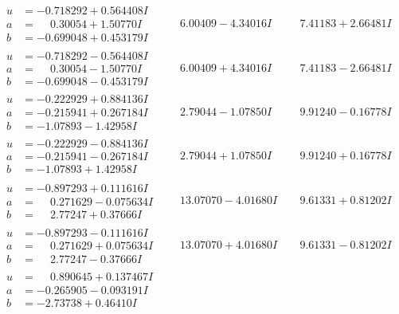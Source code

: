 \documentclass[1p]{elsarticle_modified}
\theoremstyle{definition}
\begin{document}
$$\begin{array}{c|c|c}
\begin{aligned}
u &= -0.718292 + 0.564408 I \\
a &= \phantom{-}0.30054 + 1.50770 I \\
b &= -0.699048 + 0.453179 I\end{aligned}
 & \phantom{-}6.00409 - 4.34016 I & \phantom{-}7.41183 + 2.66481 I \\ \hline\begin{aligned}
u &= -0.718292 - 0.564408 I \\
a &= \phantom{-}0.30054 - 1.50770 I \\
b &= -0.699048 - 0.453179 I\end{aligned}
 & \phantom{-}6.00409 + 4.34016 I & \phantom{-}7.41183 - 2.66481 I \\ \hline\begin{aligned}
u &= -0.222929 + 0.884136 I \\
a &= -0.215941 + 0.267184 I \\
b &= -1.07893 - 1.42958 I\end{aligned}
 & \phantom{-}2.79044 - 1.07850 I & \phantom{-}9.91240 - 0.16778 I \\ \hline\begin{aligned}
u &= -0.222929 - 0.884136 I \\
a &= -0.215941 - 0.267184 I \\
b &= -1.07893 + 1.42958 I\end{aligned}
 & \phantom{-}2.79044 + 1.07850 I & \phantom{-}9.91240 + 0.16778 I \\ \hline\begin{aligned}
u &= -0.897293 + 0.111616 I \\
a &= \phantom{-}0.271629 - 0.075634 I \\
b &= \phantom{-}2.77247 + 0.37666 I\end{aligned}
 & \phantom{-}13.07070 - 4.01680 I & \phantom{-}9.61331 + 0.81202 I \\ \hline\begin{aligned}
u &= -0.897293 - 0.111616 I \\
a &= \phantom{-}0.271629 + 0.075634 I \\
b &= \phantom{-}2.77247 - 0.37666 I\end{aligned}
 & \phantom{-}13.07070 + 4.01680 I & \phantom{-}9.61331 - 0.81202 I \\ \hline\begin{aligned}
u &= \phantom{-}0.890645 + 0.137467 I \\
a &= -0.265905 - 0.093191 I \\
b &= -2.73738 + 0.46410 I\end{aligned}

\end{array}$$
\end{document}
